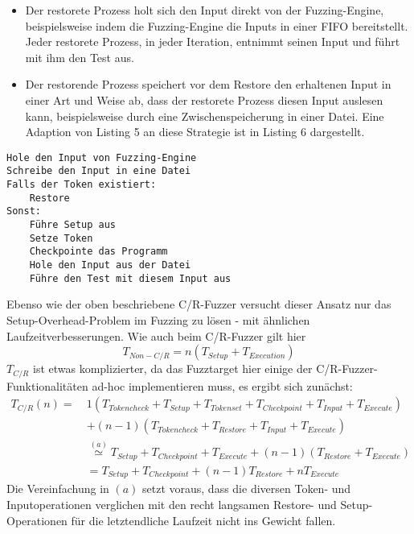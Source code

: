 \documentclass[a4paper]{article}
\begin{document}
\begin{itemize}
        \begin{itemize}
            \item Der restorete Prozess holt sich den Input direkt von der Fuzzing-Engine, beispielsweise indem die Fuzzing-Engine die Inputs in einer FIFO bereitstellt. Jeder restorete Prozess, in jeder Iteration, entnimmt seinen Input und führt mit ihm den Test aus.
            \item Der restorende Prozess speichert vor dem Restore den erhaltenen Input in einer Art und Weise ab, dass der restorete Prozess diesen Input auslesen kann, beispielsweise durch eine Zwischenspeicherung in einer Datei. Eine Adaption von Listing 5 an diese Strategie ist in Listing 6 dargestellt.
        \end{itemize}
\end{itemize}
\begin{lstlisting}[caption=Struktur C/R-Fuzztarget für Non-C/R-Fuzzer mit Zwischenspeicherung des Inputs]
Hole den Input von Fuzzing-Engine
Schreibe den Input in eine Datei
Falls der Token existiert:
    Restore
Sonst:
    Führe Setup aus
    Setze Token
    Checkpointe das Programm
    Hole den Input aus der Datei
    Führe den Test mit diesem Input aus
\end{lstlisting}
Ebenso wie der oben beschriebene C/R-Fuzzer versucht dieser Ansatz nur das Setup-Overhead-Problem im Fuzzing zu lösen - mit ähnlichen Laufzeitverbesserungen. Wie auch beim C/R-Fuzzer gilt hier
\begin{equation}
    T_{Non-C/R} = n (T_{Setup} + T_{Execution})
\end{equation}
$T_{C/R}$ ist etwas komplizierter, da das Fuzztarget hier einige der C/R-Fuzzer-Funktionalitäten ad-hoc implementieren muss, es ergibt sich zunächst:
\begin{equation}
    \begin{split}
        T_{C/R}(n) =\ &1 (T_{Tokencheck} + T_{Setup} + T_{Tokenset} + T_{Checkpoint} + T_{Input} + T_{Execute}) \\
            &+ (n - 1) (T_{Tokencheck} + T_{Restore} + T_{Input} + T_{Execute}) \\
            &\overset{(a)}{\simeq} T_{Setup} + T_{Checkpoint} + T_{Execute} + (n-1) (T_{Restore} + T_{Execute}) \\
            &= T_{Setup} + T_{Checkpoint} + (n-1) T_{Restore} + n T_{Execute}
    \end{split}
\end{equation}
Die Vereinfachung in $(a)$ setzt voraus, dass die diversen Token- und Inputoperationen verglichen mit den recht langsamen Restore- und Setup-Operationen für die letztendliche Laufzeit nicht ins Gewicht fallen.\\
\end{document}
